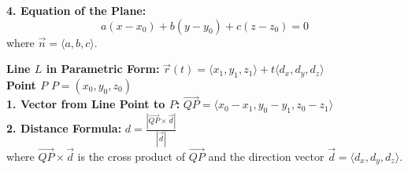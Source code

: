 \documentclass[2pt]{article}
\begin{document}
\begin{multicols}{2}
\begin{tcolorbox}[title=\textbf{Plane Containing Line \( L \) and Point \( A \)}, colframe=lightblue]
    \textbf{4. Equation of the Plane:} \\
    \[
    a(x - x_0) + b(y - y_0) + c(z - z_0) = 0
    \]
    where \(\vec{n} = \langle a, b, c \rangle\).
\end{tcolorbox}

\begin{tcolorbox}[title=\textbf{Distance from a Point to a Line}, colframe=lightblue]
    \textbf{Line \( L \) in Parametric Form:} $ \vec{r}(t) = \langle x_1, y_1, z_1 \rangle + t \langle d_x, d_y, d_z \rangle $ \\
    \textbf{Point \( P \)} $P = (x_0, y_0, z_0)$ \\
    \textbf{1. Vector from Line Point to \( P \):} $ \overrightarrow{QP} = \langle x_0 - x_1, y_0 - y_1, z_0 - z_1 \rangle $ \\
    \textbf{2. Distance Formula:} $d = \frac{|\overrightarrow{QP} \times \vec{d}|}{|\vec{d}|} $ \\
    where \(\overrightarrow{QP} \times \vec{d}\) is the cross product of \(\overrightarrow{QP}\) and the direction vector \(\vec{d} = \langle d_x, d_y, d_z \rangle\).
\end{tcolorbox}

\end{multicols}
\end{document}
